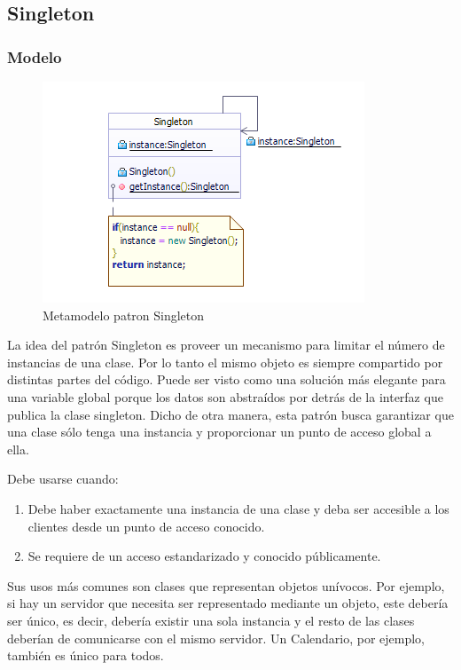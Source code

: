 \subsection{Singleton}
\subsubsection{Modelo}
\begin{figure}[th!]
	\centering
	\includegraphics[width=0.7\linewidth]{arquitectura/imagenes/PatronSingelton}
	\caption{Metamodelo patron Singleton}
\end{figure}

La idea del patrón Singleton es proveer un mecanismo para limitar el número de instancias de una clase. Por lo tanto el mismo objeto es siempre compartido por distintas partes del código. Puede ser visto como una solución más elegante para una variable global porque los datos son abstraídos por detrás de la interfaz que publica la clase singleton.
Dicho de otra manera, esta patrón busca garantizar que una clase sólo tenga una instancia y proporcionar un punto de acceso global a ella.

Debe usarse cuando:
\begin{enumerate}
	\item Debe haber exactamente una instancia de una clase y deba ser accesible a los clientes desde un punto de acceso conocido.
	\item Se requiere de un acceso estandarizado y conocido públicamente.
\end{enumerate}
  

Sus usos más comunes son clases que representan objetos unívocos. Por ejemplo, si hay un servidor que necesita ser representado mediante un objeto, este debería ser único, es decir, debería existir una sola instancia y el resto de las clases deberían de comunicarse con el mismo servidor. Un Calendario, por ejemplo, también es único para todos.
\newline

